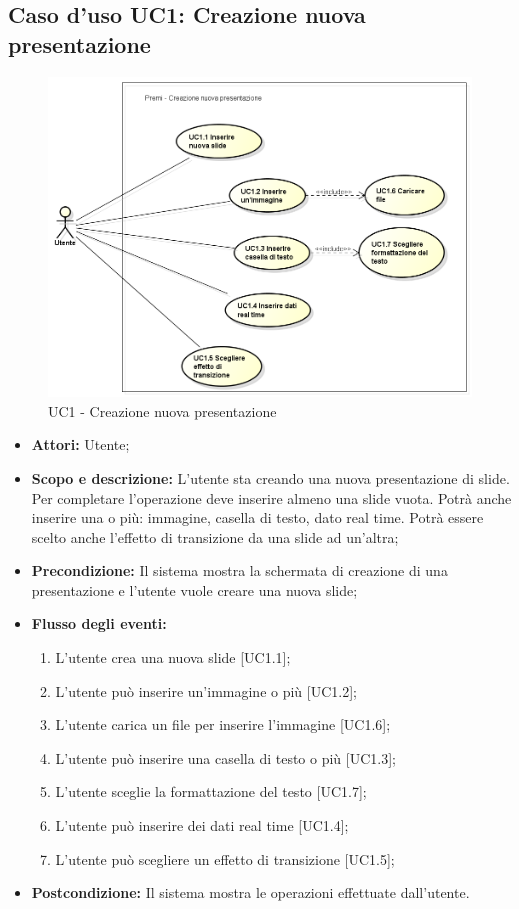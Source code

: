 \subsection{Caso d'uso UC1: Creazione nuova presentazione}
\begin{figure}[h] 
	\centering 
	\includegraphics[scale=0.45] {img/UC1.png} 
	\caption{UC1 - Creazione nuova presentazione} 
\end{figure}

\begin{itemize}
	\item \textbf{Attori:} Utente;
	\item \textbf{Scopo e descrizione:} L'utente sta creando una nuova presentazione di slide. Per completare l'operazione deve inserire almeno una slide vuota. Potrà anche inserire una o più: immagine, casella di testo, dato real time. Potrà essere scelto anche l'effetto di transizione da una slide ad un'altra;
	\item \textbf{Precondizione:} Il sistema mostra la schermata di creazione di una presentazione e l'utente vuole creare una nuova slide;
	\item \textbf{Flusso degli eventi:}
	\begin{enumerate}
		\item L'utente crea una nuova slide [UC1.1];
		\item L'utente può inserire un'immagine o più [UC1.2];
		\item L'utente carica un file per inserire l'immagine [UC1.6];
		\item L'utente può inserire una casella di testo o più [UC1.3];
		\item L'utente sceglie la formattazione del testo [UC1.7];
		\item L'utente può inserire dei dati real time [UC1.4];
		\item L'utente può scegliere un effetto di transizione [UC1.5];
	\end{enumerate}
	\item \textbf{Postcondizione:} Il sistema mostra le operazioni effettuate dall'utente.
\end{itemize}

